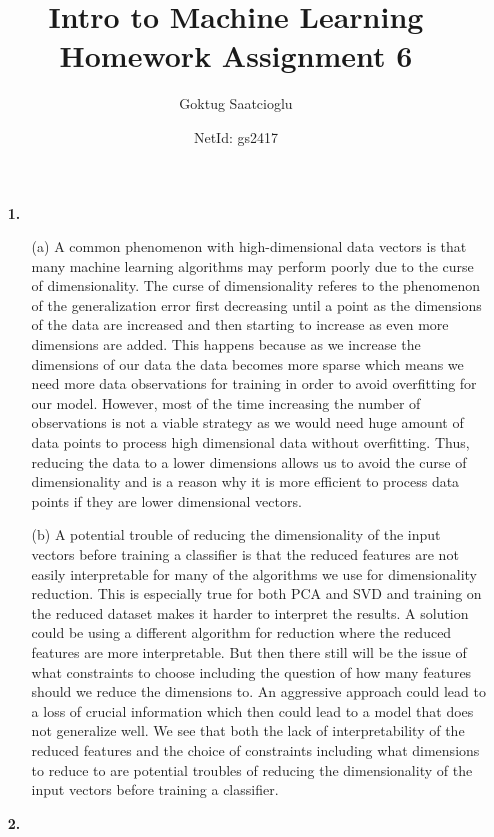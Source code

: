 \documentclass [10pt]{article}
\begin{document}
\title{Intro to Machine Learning Homework Assignment 6}
\author{Goktug Saatcioglu}
\date{NetId: gs2417}
\maketitle

\begin{enumerate}
	\item[\textbf{1.}]
	\begin{enumerate}
		\item[(a)]A common phenomenon with high-dimensional data vectors is that many machine learning algorithms may perform poorly due to the curse of dimensionality. The curse of dimensionality referes to the phenomenon of the generalization error first decreasing until a point as the dimensions of the data are increased and then starting to increase as even more dimensions are added. This happens because as we increase the dimensions of our data the data becomes more sparse which means we need more data observations for training in order to avoid overfitting for our model. However, most of the time increasing the number of observations is not a viable strategy as we would need huge amount of data points to process high dimensional data without overfitting. Thus, reducing the data to a lower dimensions allows us to avoid the curse of dimensionality and is a reason why it is more efficient to process data points if they are lower dimensional vectors.
		\item[(b)]A potential trouble of reducing the dimensionality of the input vectors before training a classifier is that the reduced features are not easily interpretable for many of the algorithms we use for dimensionality reduction. This is especially true for both PCA and SVD and training on the reduced dataset makes it harder to interpret the results. A solution could be using a different algorithm for reduction where the reduced features are more interpretable. But then there still will be the issue of what constraints to choose including the question of how many features should we reduce the dimensions to. An aggressive approach could lead to a loss of crucial information which then could lead to a model that does not generalize well. We see that both the lack of interpretability of the reduced features and the choice of constraints including what dimensions to reduce to are potential troubles of reducing the dimensionality of the input vectors before training a classifier.
	\end{enumerate}
	\item[\textbf{2.}]

\end{enumerate}
\end{document}
